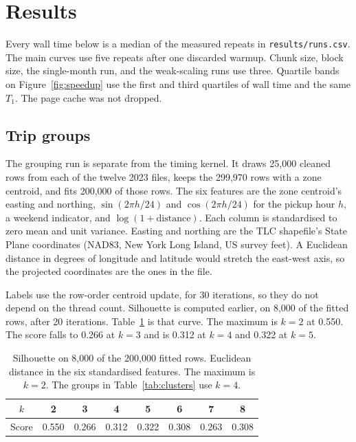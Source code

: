 \section{Results}
\label{sec:results}

Every wall time below is a median of the measured repeats in \texttt{results/runs.csv}. The main curves use five repeats after one discarded warmup. Chunk size, block size, the single-month run, and the weak-scaling runs use three. Quartile bands on Figure~\ref{fig:speedup} use the first and third quartiles of wall time and the same $T_1$. The page cache was not dropped.

\subsection{Trip groups}
\label{sec:clusters}

The grouping run is separate from the timing kernel. It draws 25{,}000 cleaned rows from each of the twelve 2023 files, keeps the 299{,}970 rows with a zone centroid, and fits 200{,}000 of those rows. The six features are the zone centroid's easting and northing, $\sin(2\pi h/24)$ and $\cos(2\pi h/24)$ for the pickup hour $h$, a weekend indicator, and $\log(1 + \text{distance})$. Each column is standardised to zero mean and unit variance. Easting and northing are the TLC shapefile's State Plane coordinates (NAD83, New York Long Island, US survey feet). A Euclidean distance in degrees of longitude and latitude would stretch the east-west axis, so the projected coordinates are the ones in the file.

Labels use the row-order centroid update, for 30 iterations, so they do not depend on the thread count. Silhouette is computed earlier, on 8{,}000 of the fitted rows, after 20 iterations. Table~\ref{tab:sil} is that curve. The maximum is $k = 2$ at 0.550. The score falls to 0.266 at $k = 3$ and is 0.312 at $k = 4$ and 0.322 at $k = 5$.

\begin{table}[ht]
\centering
\caption{Silhouette on 8{,}000 of the 200{,}000 fitted rows. Euclidean distance in the six standardised features. The maximum is $k = 2$. The groups in Table~\ref{tab:clusters} use $k = 4$.}
\label{tab:sil}
\begin{tabular}{cccccccc}
\toprule
$k$ & 2 & 3 & 4 & 5 & 6 & 7 & 8 \\
\midrule
Score & 0.550 & 0.266 & 0.312 & 0.322 & 0.308 & 0.263 & 0.308 \\
\bottomrule
\end{tabular}
\end{table}

